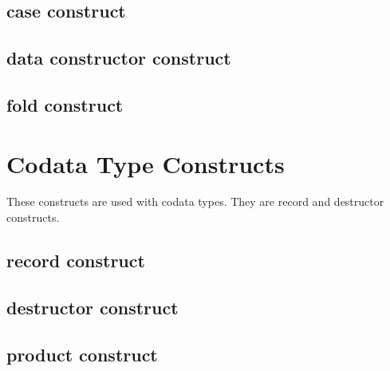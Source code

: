 \documentclass[11pt]{article}
\begin{document}
\subsection {case construct}
\subsection {data constructor construct}
\subsection {fold construct}

\section {Codata Type Constructs}
 These constructs are used with codata types. They are {\sf record} and {\sf destructor} constructs.
\subsection {record construct}
\subsection {destructor construct}
\subsection {product construct}
\end{document}
